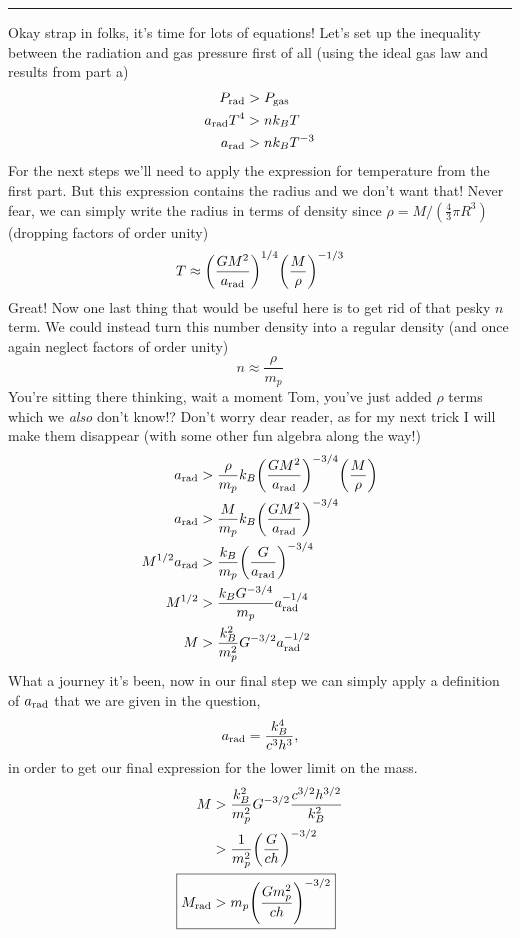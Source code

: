 \documentclass[12pt, letterpaper, twoside]{article}
\newcommand{\answer}[1]{
    \par\noindent\rule{\textwidth}{0.4pt}#1\vspace{0.5cm}
}
\begin{document}
\answer{
    Okay strap in folks, it's time for lots of equations! Let's set up the inequality between the radiation and gas pressure first of all (using the ideal gas law and results from part a)
    \begin{align}
        P_{\rm rad} &> P_{\rm gas} \\
        a_{\rm rad} T^4 &> n k_B T \\
        a_{\rm rad} &> n k_B T^{-3}
    \end{align}
    For the next steps we'll need to apply the expression for temperature from the first part. But this expression contains the radius and we don't want that! Never fear, we can simply write the radius in terms of density since $\rho = M / (\frac{4}{3} \pi R^3)$ (dropping factors of order unity)
    \begin{equation}
        T \approx \qty(\frac{G M^2}{a_{\rm rad}})^{1/4} \qty(\frac{M}{\rho})^{-1/3}
    \end{equation}
    Great! Now one last thing that would be useful here is to get rid of that pesky $n$ term. We could instead turn this number density into a regular density (and once again neglect factors of order unity)
    \begin{equation}
        n \approx \frac{\rho}{m_p}
    \end{equation}
    You're sitting there thinking, wait a moment Tom, you've just added $\rho$ terms which we \textit{also} don't know!? Don't worry dear reader, as for my next trick I will make them disappear (with some other fun algebra along the way!)
    \begin{align}
        a_{\rm rad} &> \frac{\rho}{m_p} k_B \qty(\frac{G M^2}{a_{\rm rad}})^{-3/4} \qty(\frac{M}{\rho}) \\
        a_{\rm rad} &> \frac{M}{m_p} k_B \qty(\frac{G M^2}{a_{\rm rad}})^{-3/4} \\
        M^{1/2} a_{\rm rad} &> \frac{k_B}{m_p} \qty(\frac{G}{a_{\rm rad}})^{-3/4} \\
        M^{1/2} &> \frac{k_B G^{-3/4}}{m_p} a_{\rm rad}^{-1/4} \\
        M &> \frac{k_B^2}{m_p^2} G^{-3/2} a_{\rm rad}^{-1/2}
    \end{align}
    What a journey it's been, now in our final step we can simply apply a definition of $a_{\rm rad}$ that we are given in the question,
    \begin{equation}
        a_{\rm rad} = \frac{k_B^4}{c^3 h^3},
    \end{equation}
    in order to get our final expression for the lower limit on the mass.
    \begin{align}
        M &> \frac{k_B^2}{m_p^2} G^{-3/2} \frac{c^{3/2} h^{3/2}}{k_B^2} \\
          &> \frac{1}{m_p^2} \qty(\frac{G}{c h})^{-3/2} \\
        \Aboxed{ M_{\rm rad} &> m_p \qty(\frac{G m_p^2}{c h})^{-3/2} }
    \end{align}
}
\end{document}
